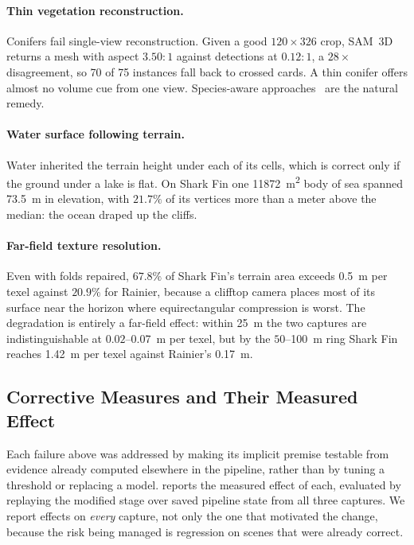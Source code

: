 \paragraph{Thin vegetation reconstruction.}
Conifers fail single-view reconstruction. Given a good $120\times326$ crop, SAM~3D
returns a mesh with aspect $3.50{:}1$ against detections at $0.12{:}1$, a
$28\times$ disagreement, so 70 of 75 instances fall back to crossed cards. A thin
conifer offers almost no volume cue from one view. Species-aware
approaches~\cite{lee2024tree} are the natural remedy.

\paragraph{Water surface following terrain.}
Water inherited the terrain height under each of its cells, which is correct only
if the ground under a lake is flat. On Shark Fin one \SI{11872}{\meter\squared}
body of sea spanned \SI{73.5}{\meter} in elevation, with $21.7\%$ of its vertices
more than a meter above the median: the ocean draped up the cliffs.

\paragraph{Far-field texture resolution.}
Even with folds repaired, $67.8\%$ of Shark Fin's terrain area exceeds
\SI{0.5}{\meter} per texel against $20.9\%$ for Rainier, because a clifftop camera
places most of its surface near the horizon where equirectangular compression is
worst. The degradation is entirely a far-field effect: within \SI{25}{\meter} the
two captures are indistinguishable at $0.02$--\SI{0.07}{\meter} per texel, but by
the $50$--\SI{100}{\meter} ring Shark Fin reaches \SI{1.42}{\meter} per texel
against Rainier's \SI{0.17}{\meter}.

\subsection{Corrective Measures and Their Measured Effect}
\label{sec:remediation}

Each failure above was addressed by making its implicit premise testable from
evidence already computed elsewhere in the pipeline, rather than by tuning a
threshold or replacing a model.  reports the measured effect of
each, evaluated by replaying the modified stage over saved pipeline state from all
three captures. We report effects on \emph{every} capture, not only the one that
motivated the change, because the risk being managed is regression on scenes that
were already correct.

